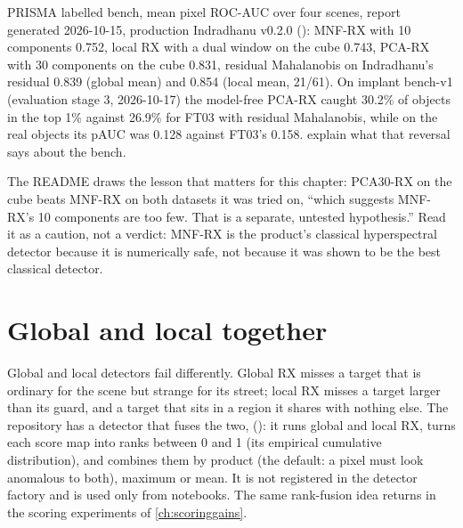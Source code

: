\begin{drift}
PRISMA labelled bench, mean pixel ROC-AUC over four scenes, report generated 2026-10-15, production Indradhanu
v0.2.0 (): MNF-RX with 10 components 0.752,
local RX with a dual window on the cube 0.743, PCA-RX with 30 components on the cube 0.831, residual
Mahalanobis on Indradhanu's residual 0.839 (global mean) and 0.854 (local mean, 21/61). On implant
bench-v1 (evaluation stage 3, 2026-10-17) the model-free PCA-RX caught 30.2\% of objects in the top 1\% against 26.9\% for FT03 with
residual Mahalanobis, while on the real objects its pAUC was 0.128 against FT03's
0.158. 
explain what that reversal says about the bench.
\end{drift}

The README draws the lesson that matters for this chapter: PCA30-RX on the cube beats MNF-RX on both
datasets it was tried on, ``which suggests MNF-RX's 10 components are too few. That is a separate,
untested hypothesis.'' Read it as a caution, not a verdict: MNF-RX is the product's classical
hyperspectral detector because it is numerically safe, not because it was shown to be the best
classical detector.

\section{Global and local together}\label{sec:localrx:together}

Global and local detectors fail differently. Global RX misses a target that is ordinary for the scene
but strange for its street; local RX misses a target larger than its guard, and a target that sits in a
region it shares with nothing else. The repository has a detector that fuses the two,
 (): it runs global and local RX,
turns each score map into ranks between 0 and 1 (its empirical cumulative distribution), and combines
them by product (the default: a pixel must look anomalous to both), maximum or mean. It is not
registered in the detector factory and is used only from notebooks. The same rank-fusion idea returns in
the scoring experiments of \cref{ch:scoringgains}.

